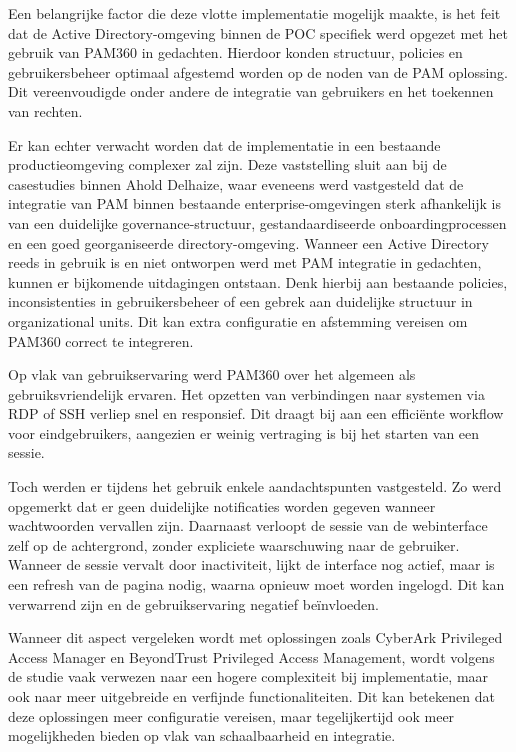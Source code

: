 Een belangrijke factor die deze vlotte implementatie mogelijk maakte, is het feit dat de Active Directory-omgeving binnen de POC specifiek werd opgezet met het gebruik van PAM360 in gedachten. Hierdoor konden structuur, policies en gebruikersbeheer optimaal afgestemd worden op de noden van de PAM oplossing. Dit vereenvoudigde onder andere de integratie van gebruikers en het toekennen van rechten.

Er kan echter verwacht worden dat de implementatie in een bestaande productieomgeving complexer zal zijn. Deze vaststelling sluit aan bij de casestudies binnen Ahold Delhaize, waar eveneens werd vastgesteld dat de integratie van PAM binnen bestaande enterprise-omgevingen sterk afhankelijk is van een duidelijke governance-structuur, gestandaardiseerde onboardingprocessen en een goed georganiseerde directory-omgeving. Wanneer een Active Directory reeds in gebruik is en niet ontworpen werd met PAM integratie in gedachten, kunnen er bijkomende uitdagingen ontstaan. Denk hierbij aan bestaande policies, inconsistenties in gebruikersbeheer of een gebrek aan duidelijke structuur in organizational units. Dit kan extra configuratie en afstemming vereisen om PAM360 correct te integreren.

Op vlak van gebruikservaring werd PAM360 over het algemeen als gebruiksvriendelijk ervaren. Het opzetten van verbindingen naar systemen via RDP of SSH verliep snel en responsief. Dit draagt bij aan een efficiënte workflow voor eindgebruikers, aangezien er weinig vertraging is bij het starten van een sessie.

Toch werden er tijdens het gebruik enkele aandachtspunten vastgesteld. Zo werd opgemerkt dat er geen duidelijke notificaties worden gegeven wanneer wachtwoorden vervallen zijn. Daarnaast verloopt de sessie van de webinterface zelf op de achtergrond, zonder expliciete waarschuwing naar de gebruiker. Wanneer de sessie vervalt door inactiviteit, lijkt de interface nog actief, maar is een refresh van de pagina nodig, waarna opnieuw moet worden ingelogd. Dit kan verwarrend zijn en de gebruikservaring negatief beïnvloeden.

Wanneer dit aspect vergeleken wordt met oplossingen zoals CyberArk Privileged Access Manager en BeyondTrust Privileged Access Management, wordt volgens de studie vaak verwezen naar een hogere complexiteit bij implementatie, maar ook naar meer uitgebreide en verfijnde functionaliteiten. Dit kan betekenen dat deze oplossingen meer configuratie vereisen, maar tegelijkertijd ook meer mogelijkheden bieden op vlak van schaalbaarheid en integratie.

